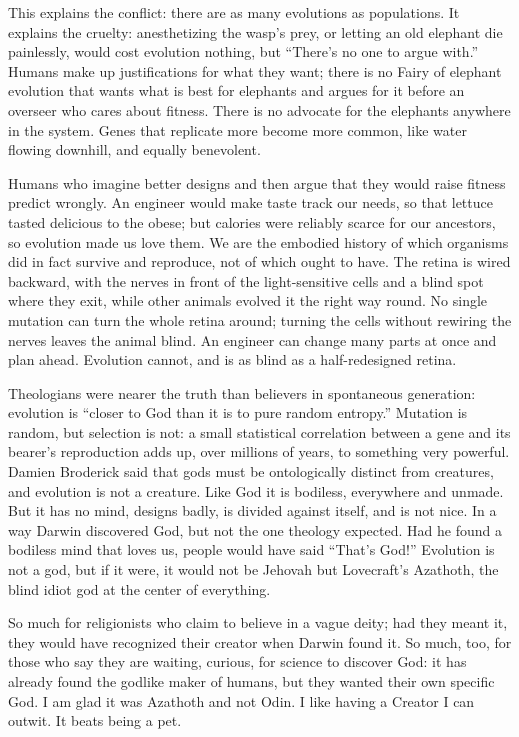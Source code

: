 This explains the conflict: there are as many evolutions as populations. It explains the cruelty: anesthetizing the wasp's prey, or letting an old elephant die painlessly, would cost evolution nothing, but ``There's no one to argue with.'' Humans make up justifications for what they want; there is no Fairy of elephant evolution that wants what is best for elephants and argues for it before an overseer who cares about fitness. There is no advocate for the elephants anywhere in the system. Genes that replicate more become more common, like water flowing downhill, and equally benevolent.

Humans who imagine better designs and then argue that they would raise fitness predict wrongly. An engineer would make taste track our needs, so that lettuce tasted delicious to the obese; but calories were reliably scarce for our ancestors, so evolution made us love them. We are the embodied history of which organisms did in fact survive and reproduce, not of which ought to have. The retina is wired backward, with the nerves in front of the light-sensitive cells and a blind spot where they exit, while other animals evolved it the right way round. No single mutation can turn the whole retina around; turning the cells without rewiring the nerves leaves the animal blind. An engineer can change many parts at once and plan ahead. Evolution cannot, and is as blind as a half-redesigned retina.

Theologians were nearer the truth than believers in spontaneous generation: evolution is ``closer to God than it is to pure random entropy.'' Mutation is random, but selection is not: a small statistical correlation between a gene and its bearer's reproduction adds up, over millions of years, to something very powerful. Damien Broderick said that gods must be ontologically distinct from creatures, and evolution is not a creature. Like God it is bodiless, everywhere and unmade. But it has no mind, designs badly, is divided against itself, and is not nice. In a way Darwin discovered God, but not the one theology expected. Had he found a bodiless mind that loves us, people would have said ``That's God!'' Evolution is not a god, but if it were, it would not be Jehovah but Lovecraft's Azathoth, the blind idiot god at the center of everything.

So much for religionists who claim to believe in a vague deity; had they meant it, they would have recognized their creator when Darwin found it.  So much, too, for those who say they are waiting, curious, for science to discover God: it has already found the godlike maker of humans, but they wanted their own specific God. I am glad it was Azathoth and not Odin. I like having a Creator I can outwit. It beats being a pet.
